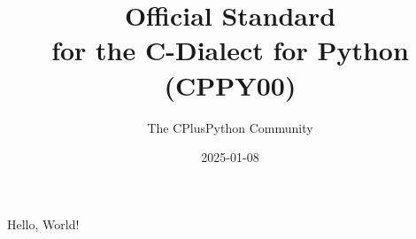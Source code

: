 

\title{
    Official Standard \\
    for the C-Dialect for Python \\
    (CPPY00)
}
\date{ 2025-01-08}
\author{The CPlusPython Community}


\maketitle
Hello, World!
